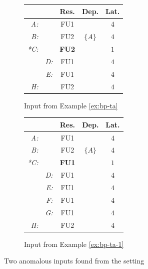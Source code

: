 \begin{figure}
    \centering
    \begin{subfigure}[b]{0.45\textwidth}
        \centering
        \begin{tabular}{rr|ccc}
            &  & Res. & Dep. & Lat. \\ \hline
            \textit{A:} &  & FU1 &  & $4$ \\
            \textit{B:} &  & FU2 & $\{A\}$ & $4$ \\
            \textit{*C:} &  & \textbf{FU2} &  & $1$ \\
            & \textit{D:} & FU1 &  & $4$ \\
            & \textit{E:} & FU1 &  & $4$ \\
            \textit{H:} &  & FU2 &  & $4$ \\
        \end{tabular}
        \caption{Input from Example \ref{ex:bp-ta}}
        \label{fig:bp-ta-inputs-0}
    \end{subfigure}
    \hfill
    \begin{subfigure}[b]{0.45\textwidth}
        \centering
        
        \begin{tabular}{rr|ccc}
            &  & Res. & Dep. & Lat. \\ \hline
            \textit{A:} &  & FU1 &  & $4$ \\
            \textit{B:} &  & FU2 & $\{A\}$ & $4$ \\
            \textit{*C:} &  & \textbf{FU1} &  & $1$ \\
            & \textit{D:} & FU1 &  & $4$ \\
            & \textit{E:} & FU1 &  & $4$ \\
            & \textit{F:} & FU1 &  & $4$ \\
            & \textit{G:} & FU1 &  & $4$ \\
            \textit{H:} &  & FU2 &  & $4$ \\
        \end{tabular}
        \caption{Input from Example \ref{ex:bp-ta-1}}
        \label{fig:bp-ta-inputs-1}
    \end{subfigure}
    \caption{Two anomalous inputs found from the setting}
    \label{fig:bp-ta-inputs}
\end{figure}



